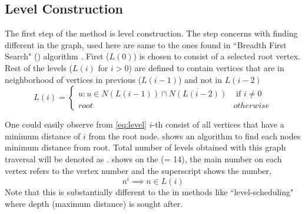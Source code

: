 \subsection{Level Construction}\label{subsec:LEVEL_CONST}
The first step of the \RACE method is level construction. The step concerns with finding different \levels in the graph, \levels used here are same to the ones found in ``Breadth First Search" (\BFS) algorithm \cite{BFS}. First \level ($L(0)$) is chosen to consist of a selected root vertex. Rest of the levels ($L(i)$ for $i > 0$) are defined to  contain vertices that are in neighborhood of vertices in previous \level ($L(i-1)$) and not in $L(i-2)$ \cite{BFS_level_def} \ie
\begin{equation}\label{eq:level}
L(i) = 
\begin{cases}
	  u : u \in N(L(i-1)) \cap \overline{N(L(i-2))}  & \text{ if } i \neq 0 \\
	 root & otherwise
\end{cases}   
\end{equation}

 One could easily observe from \cref{eq:level} $i$-th \level consist of all vertices that have a minimum distance of $i$ from the root node.  shows an algorithm to find each nodes minimum distance from root. Total number of levels obtained with this graph traversal will be denoted as \totalLvl.  shows \levels on the \STEX (\totalLvl = 14), the main number on each vertex refers to the vertex number and the superscript shows the \level number, \ie
\begin{equation}\label{eq:node_notation}
	n^i \implies n \in L(i)
\end{equation}
Note that this is substantially different to the \levels in methods like ``level-scheduling" \cite{saad} where depth (maximum distance) is sought after.

